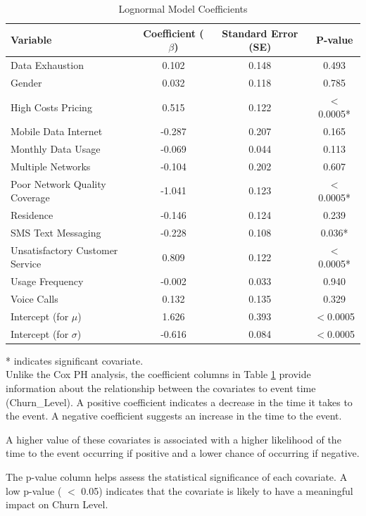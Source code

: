 \documentclass[doublespacing,12pt]{report}
\begin{document}
{\begin{table}[H]
\centering
\begin{tabular}{lccc}
\toprule
Variable & Coefficient (${\beta}$)& Standard Error (SE) & P-value\\
\midrule
Data Exhaustion& 0.102 & 0.148 & 0.493 \\
Gender & 0.032 & 0.118 & 0.785 \\
High Costs Pricing & 0.515 & 0.122 & $<$0.0005*\\
Mobile Data Internet & -0.287 & 0.207 & 0.165 \\
Monthly Data Usage & -0.069 & 0.044 & 0.113 \\
Multiple Networks & -0.104 & 0.202 & 0.607 \\
Poor Network Quality Coverage & -1.041 & 0.123 & $<$0.0005*\\
Residence & -0.146 & 0.124 & 0.239 \\
SMS Text Messaging & -0.228 & 0.108 & 0.036*\\
Unsatisfactory Customer Service & 0.809 & 0.122 & $<$0.0005*\\
Usage Frequency & -0.002 & 0.033 & 0.940 \\
Voice Calls & 0.132 & 0.135 & 0.329 \\
Intercept (for $\mu$) & 1.626 & 0.393 & $<$0.0005\\
Intercept (for $\sigma$) & -0.616 & 0.084 & $<$0.0005\\
\bottomrule
\end{tabular}
\caption{Lognormal Model Coefficients}
\label{table:lognormal_coefficients}
\end{table}
{* indicates significant covariate.}
\vspace{0.4cm}\\
\normalsize{\noindent Unlike the Cox PH analysis, the coefficient columns in Table \ref{table:lognormal_coefficients} provide information about the relationship between the covariates to event time (Churn\_Level). A positive coefficient indicates a decrease in the time it takes to the event. A negative coefficient suggests an increase in the time to the event. }

\normalsize{\noindent A higher value of these covariates is associated with a higher  likelihood of the time to the event occurring if positive and a lower chance of occurring if negative.}
 
\normalsize{\noindent The p-value column helps assess the statistical significance of each covariate. A low p-value ( \(< \) 0.05) indicates that the covariate is likely to have a meaningful impact on Churn Level. }

}
\end{document}
